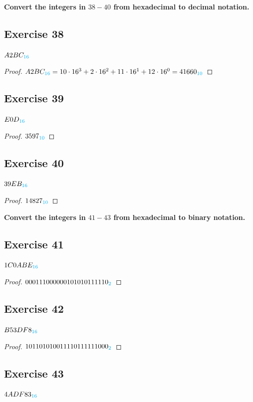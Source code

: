 \documentclass[14pt]{extarticle}
\newcommand{\base}[1]{{\color{cyan}#1}}
\begin{document}
{\bf \color{cyan} Convert the integers in $38-40$ from hexadecimal to decimal notation.}

\subsection{Exercise 38} 
$A2BC_\base{16}$

\begin{proof} 
$A2BC_\base{16} = 10 \cdot 16^3 + 2 \cdot 16^2 + 11 \cdot 16^1 +
12 \cdot 16^0 = 41660_\base{10}$ 
\end{proof}

\subsection{Exercise 39} 
$E0D_\base{16}$

\begin{proof} 
$3597_\base{10}$ 
\end{proof}

\subsection{Exercise 40} 
$39EB_\base{16}$

\begin{proof} 
$14827_\base{10}$ 
\end{proof}

{\bf \color{cyan} Convert the integers in $41-43$ from hexadecimal to binary notation.}

\subsection{Exercise 41} 
$1C0ABE_\base{16}$

\begin{proof} 
$000111000000101010111110_\base{2}$ 
\end{proof}

\subsection{Exercise 42} 
$B53DF8_\base{16}$

\begin{proof} 
$101101010011110111111000_\base{2}$ 
\end{proof}

\subsection{Exercise 43} 
$4ADF83_\base{16}$
\end{document}
